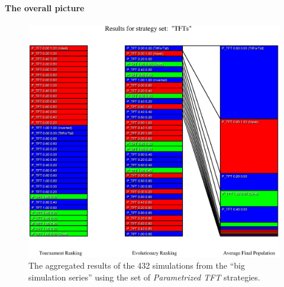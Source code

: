 \paragraph{The overall picture}

\begin{figure}
\begin{center}
\includegraphics[width=20cm]{images/BigSeries_TFT.eps} %
\caption{\label{BigSimGlobalResults} The aggregated results of the 432
  simulations from the ``big simulation series'' using the set of {\em
    Parametrized TFT} strategies.}
\end{center}
\end{figure}

